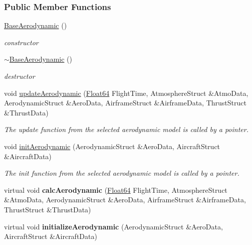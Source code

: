 \subsubsection*{Public Member Functions}
\begin{DoxyCompactItemize}
\item 
\mbox{\label{group___aerodynamic_aa05d0598119b1364cdb45cf478ae578c}} 
\hyperlink{group___aerodynamic_aa05d0598119b1364cdb45cf478ae578c}{Base\+Aerodynamic} ()
\begin{DoxyCompactList}\small\item\em constructor \end{DoxyCompactList}\item 
\mbox{\label{group___aerodynamic_a81d08f3a779e6e25245b6f3b545920cb}} 
\hyperlink{group___aerodynamic_a81d08f3a779e6e25245b6f3b545920cb}{$\sim$\+Base\+Aerodynamic} ()
\begin{DoxyCompactList}\small\item\em destructor \end{DoxyCompactList}\item 
\mbox{\label{group___aerodynamic_a6354f3c8433c7a2235041f843d4fe10e}} 
void \hyperlink{group___aerodynamic_a6354f3c8433c7a2235041f843d4fe10e}{update\+Aerodynamic} (\hyperlink{group___tools_ga3f1431cb9f76da10f59246d1d743dc2c}{Float64} Flight\+Time, Atmosphere\+Struct \&Atmo\+Data, Aerodynamic\+Struct \&Aero\+Data, Airframe\+Struct \&Airframe\+Data, Thrust\+Struct \&Thrust\+Data)
\begin{DoxyCompactList}\small\item\em The update function from the selected aerodynamic model is called by a pointer. \end{DoxyCompactList}\item 
\mbox{\label{group___aerodynamic_a5ea58755a40507d217848efb151879c8}} 
void \hyperlink{group___aerodynamic_a5ea58755a40507d217848efb151879c8}{init\+Aerodynamic} (Aerodynamic\+Struct \&Aero\+Data, Aircraft\+Struct \&Aircraft\+Data)
\begin{DoxyCompactList}\small\item\em The init function from the selected aerodynamic model is called by a pointer. \end{DoxyCompactList}\item 
\mbox{\label{group___aerodynamic_a2a2d641c761198459eba1719d6ea78e9}} 
virtual void {\bfseries calc\+Aerodynamic} (\hyperlink{group___tools_ga3f1431cb9f76da10f59246d1d743dc2c}{Float64} Flight\+Time, Atmosphere\+Struct \&Atmo\+Data, Aerodynamic\+Struct \&Aero\+Data, Airframe\+Struct \&Airframe\+Data, Thrust\+Struct \&Thrust\+Data)
\item 
\mbox{\label{group___aerodynamic_a8d03c242b55c9855c050ae510bf9d9c4}} 
virtual void {\bfseries initialize\+Aerodynamic} (Aerodynamic\+Struct \&Aero\+Data, Aircraft\+Struct \&Aircraft\+Data)
\end{DoxyCompactItemize}
